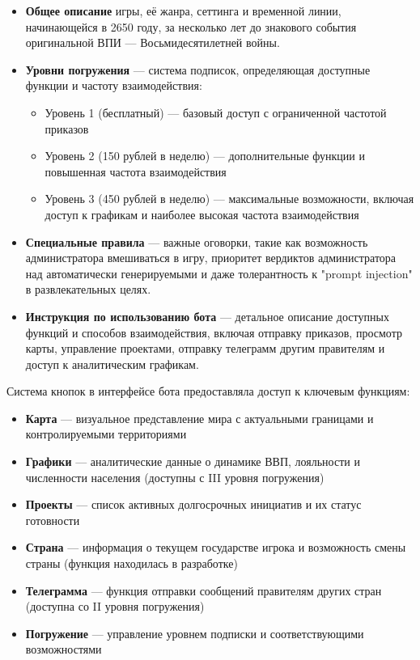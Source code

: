 \begin{itemize}
    \item \textbf{Общее описание} игры, её жанра, сеттинга и временной линии, начинающейся в 2650 году, за несколько лет до знакового события оригинальной ВПИ — Восьмидесятилетней войны.

    \item \textbf{Уровни погружения} — система подписок, определяющая доступные функции и частоту взаимодействия:
    \begin{itemize}
        \item Уровень 1 (бесплатный) — базовый доступ с ограниченной частотой приказов
        \item Уровень 2 (150 рублей в неделю) — дополнительные функции и повышенная частота взаимодействия
        \item Уровень 3 (450 рублей в неделю) — максимальные возможности, включая доступ к графикам и наиболее высокая частота взаимодействия
    \end{itemize}

    \item \textbf{Специальные правила} — важные оговорки, такие как возможность администратора вмешиваться в игру, приоритет вердиктов администратора над автоматически генерируемыми и даже толерантность к "{}prompt injection"{} в развлекательных целях.

    \item \textbf{Инструкция по использованию бота} — детальное описание доступных функций и способов взаимодействия, включая отправку приказов, просмотр карты, управление проектами, отправку телеграмм другим правителям и доступ к аналитическим графикам.
\end{itemize}

Система кнопок в интерфейсе бота предоставляла доступ к ключевым функциям:

\begin{itemize}
    \item \textbf{Карта} — визуальное представление мира с актуальными границами и контролируемыми территориями
    \item \textbf{Графики} — аналитические данные о динамике ВВП, лояльности и численности населения (доступны с III уровня погружения)
    \item \textbf{Проекты} — список активных долгосрочных инициатив и их статус готовности
    \item \textbf{Страна} — информация о текущем государстве игрока и возможность смены страны (функция находилась в разработке)
    \item \textbf{Телеграмма} — функция отправки сообщений правителям других стран (доступна со II уровня погружения)
    \item \textbf{Погружение} — управление уровнем подписки и соответствующими возможностями
\end{itemize}

